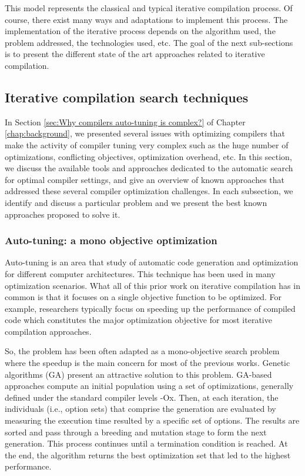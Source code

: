 This model represents the classical and typical iterative compilation process. Of course, there exist many ways and adaptations to implement this process. The implementation of the iterative process depends on the algorithm used, the problem addressed, the technologies used, etc. The goal of the next sub-sections is to present the different state of the art approaches related to iterative compilation.

\subsection{Iterative compilation search techniques}
In Section \ref{sec:Why compilers auto-tuning is complex?} of Chapter \ref{chap:background}, we presented several issues with optimizing compilers that make the activity of compiler tuning very complex such as the huge number of optimizations, conflicting objectives, optimization overhead, etc.
In this section, we discuss the available tools and approaches dedicated to the automatic search for optimal compiler settings, and give an overview of known approaches that addressed these several compiler optimization challenges. In each subsection, we identify and discuss a particular problem and we present the best known approaches proposed to solve it.

\subsubsection{Auto-tuning: a mono objective optimization}
Auto-tuning is an area that study of automatic code generation and optimization for different computer architectures.
This technique has been used in many optimization scenarios.
What all of this prior work on iterative compilation has in common is that it focuses on a single objective function to be optimized. For example, researchers typically focus on speeding up the performance of compiled code which constitutes the major optimization objective for most iterative compilation approaches\cite{pan2006fast,haneda2005automatic}. 

So, the problem has been often adapted as a mono-objective search problem where the speedup is the main concern for most of the previous works. 
Genetic algorithms (GA)\cite{stephenson2003genetic,bashkansky2007black} present an attractive solution to this problem. 
GA-based approaches compute an initial population using a set of optimizations, generally defined under the standard compiler levels -Ox. Then, at each iteration, the individuals (i.e., option sets) that comprise the generation are evaluated by measuring the execution time resulted by a specific set of options. The results are sorted and pass through a breeding and mutation stage to form the next generation. This
process continues until a termination condition is reached. At the end, the algorithm returns the best optimization set that led to the highest performance.

